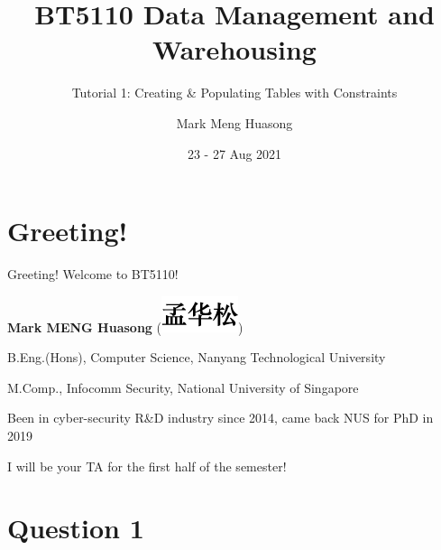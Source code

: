 \title{BT5110 Data Management and Warehousing}

\subtitle{Tutorial 1: Creating \& Populating Tables with Constraints}

\author{Mark Meng Huasong}



\date{23 - 27 Aug 2021}

\begin{frame}
	\titlepage
\end{frame}

\section*{Greeting!}

\begin{frame}[fragile]{Greeting!}
Welcome to BT5110!\vspace{15pt}

\textbf{Mark MENG Huasong} (\includegraphics[height=\fontcharht\font`\B]{t1/images/chn-chars.png}) \vspace{15pt}

B.Eng.(Hons), Computer Science, Nanyang Technological University

M.Comp., Infocomm Security, National University of Singapore\vspace{15pt}

Been in cyber-security R\&D industry since 2014, came back NUS for PhD in 2019\vspace{15pt}

I will be your TA for the first half of the semester!
\end{frame}

\section*{Question 1}

